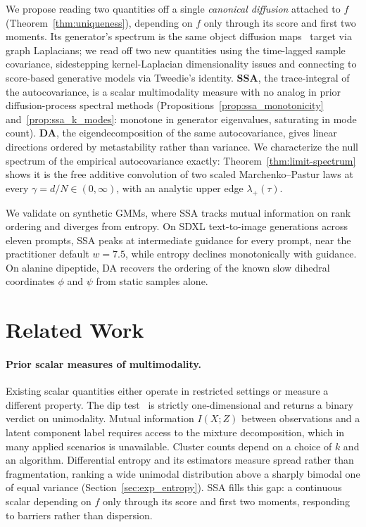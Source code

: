 \documentclass{article}
\begin{document}
We propose reading two quantities off a single \emph{canonical
diffusion} attached to $f$ (Theorem~\ref{thm:uniqueness}), depending
on $f$ only through its score and first two moments. Its generator's spectrum
is the same object diffusion maps~\cite{coifman2006,nadler2005diffusion}
target via graph Laplacians; we read off two new quantities using the
time-lagged sample covariance, sidestepping kernel-Laplacian
dimensionality issues and connecting to score-based generative models
via Tweedie's identity. \textbf{SSA}, the trace-integral of the
autocovariance, is a scalar multimodality measure with no analog in
prior diffusion-process spectral methods (Propositions~\ref{prop:ssa_monotonicity}
and~\ref{prop:ssa_k_modes}: monotone in generator eigenvalues,
saturating in mode count).
\textbf{DA}, the eigendecomposition of the same autocovariance, gives
linear directions ordered by metastability rather than variance. We
characterize the null spectrum of the empirical autocovariance exactly:
Theorem~\ref{thm:limit-spectrum} shows it is the free additive
convolution of two scaled Marchenko--Pastur laws at every $\gamma = d/N \in (0, \infty)$,
with an analytic upper edge $\lambda_+(\tau)$.


We validate on synthetic GMMs, where SSA tracks mutual information
on rank ordering and diverges from entropy. On SDXL text-to-image
generations across eleven prompts, SSA peaks at intermediate guidance
for every prompt, near the practitioner default $w = 7.5$, while
entropy declines monotonically with guidance. On alanine dipeptide, DA recovers the ordering of the known slow dihedral coordinates $\phi$ and $\psi$ from static samples alone.




\section{Related Work}
\label{sec:related}

\paragraph{Prior scalar measures of multimodality.}
Existing scalar quantities either operate in restricted settings or measure
a different property. The dip test~\cite{hartigan1985} is strictly
one-dimensional and returns a binary verdict on unimodality. Mutual
information $I(X;Z)$ between observations and a latent component label
requires access to the mixture decomposition, which in many applied scenarios is unavailable.
Cluster counts depend on a choice of $k$ and an algorithm. Differential
entropy and its estimators measure spread rather than fragmentation, ranking
a wide unimodal distribution above a sharply bimodal one of equal variance
(Section~\ref{sec:exp_entropy}). SSA fills this gap: a continuous scalar depending on $f$ only through its score and first two moments, responding to barriers rather than dispersion.
\end{document}
